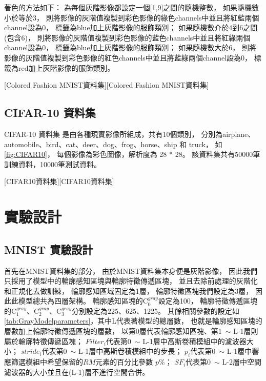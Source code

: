 \documentclass[class=NCU\_thesis, crop=false]{standalone}
\begin{document}
    著色的方法如下：
    為每個灰階影像都設定一個[1,9]之間的隨機整數，
    如果隨機數小於等於3，
    則將影像的灰階值複製到彩色影像的綠色channels中並且將紅藍兩個channel設為0，
    標籤為blue加上灰階影像的服飾類別；
    如果隨機數介於4到6之間(包含6)，
    則將影像的灰階值複製到彩色影像的藍色channels中並且將紅綠兩個channel設為0，
    標籤為blue加上灰階影像的服飾類別；
    如果隨機數大於6，
    則將影像的灰階值複製到彩色影像的紅色channels中並且將藍綠兩個channel設為0，
    標籤為red加上灰階影像的服飾類別。

    [Colored Fashion MNIST資料集][Colored Fashion MNIST資料集]
    \pagebreak

    \subsection{CIFAR-10 資料集}
    CIFAR-10 資料集\cite{CIFAR10} 是由各種現實影像所組成，共有10個類別，
    分別為airplane、automobile、bird、cat、deer、dog、frog、horse、ship 和 truck，
    如\cref{fig:CIFAR10}，
    每個影像為彩色圖像，解析度為 28 * 28。
    該資料集共有50000筆訓練資料，10000筆測試資料。

    [CIFAR10資料集\cite{CIFAR10}][CIFAR10資料集]
    \pagebreak
\section{實驗設計}
    \subsection{MNIST 實驗設計}
    首先在MNIST資料集的部分，
    由於MNIST資料集本身便是灰階影像，
    因此我們只採用了模型中的輪廓感知區塊與輪廓特徵傳遞區塊，
    並且去除前處理的灰階化和正規化去做訓練，
    輪廓感知區域固定為1層，
    輪廓特徵區塊我們設定為3層，
    因此此模型總共為四層架構。
    輪廓感知區塊的C$^{gray}_{0}$設定為100，
    輪廓特徵傳遞區塊的C$^{gray}_{1}$、C$^{gray}_{2}$、C$^{gray}_{3}$分別設定為225、625、1225。
    其餘相關參數的設定如\cref{tab:GrayModelparameters}，其中L代表著模型的總層數，
    也就是輪廓感知區塊的層數加上輪廓特徵傳遞區塊的層數，
    以第0層代表輪廓感知區塊、第1~$\sim$ L-1層則屬於輪廓特徵傳遞區塊；
    $Filter_{i}$代表第0~$\sim$ L-1層中高斯卷積模組中的濾波器大小；
    $stride_{i}$代表第0~$\sim$ L-1層中高斯卷積模組中的步長；
    $p_{i}$代表第0~$\sim$ L-1層中響應篩選模組中希望保留的$RM$元素的百分比參數 $p\%$；
    $SF_{i}$代表第0~$\sim$ L-2層中空間濾波器的大小並且在(L-1)層不進行空間合併。
\end{document}
